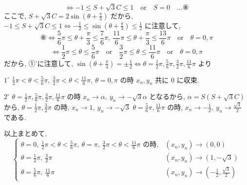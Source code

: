 \documentclass[../main.tex]{subfiles}
\begin{document}
\[
  \iff -1 \le S + \sqrt{3}C \le 1 \quad \text{or} \quad S = 0 \quad \dots \text{⑧}
\]
ここで, $S + \sqrt{3}C = 2 \sin\left(\theta + \frac{\pi}{3}\right)$ だから, $-1 \le S + \sqrt{3}C \le 1 \iff -\frac{1}{2} \le \sin\left(\theta + \frac{\pi}{3}\right) \le \frac{1}{2}$ に注意して,
\[
  ⑧ \iff \frac{5}{6}\pi \le \theta + \frac{\pi}{3} \le \frac{7}{6}\pi, \ \frac{11}{6}\pi \le \theta + \frac{\pi}{3} \le \frac{13}{6}\pi \quad \text{or} \quad \theta = 0, \pi
\]
\[
  \iff \frac{1}{2}\pi \le \theta \le \frac{5}{6}\pi \quad \text{or} \quad \frac{3}{2}\pi \le \theta \le \frac{11}{6}\pi \quad \text{or} \quad \theta = 0, \pi
\]
だから, ①'に注意して, $\sin\left(\theta + \frac{\pi}{3}\right) = \pm \frac{1}{2} \iff \theta = \frac{1}{2}\pi, \frac{5}{6}\pi, \frac{3}{2}\pi, \frac{11}{6}\pi$ より

$1^\circ$ $\frac{1}{2}\pi < \theta < \frac{5}{6}\pi, \ \frac{3}{2}\pi < \theta < \frac{11}{6}\pi, \ \theta = 0, \pi$ の時
$x_n, y_n$ 共に 0 に収束.

$2^\circ$ $\theta = \frac{1}{2}\pi, \frac{5}{6}\pi, \frac{3}{2}\pi, \frac{11}{6}\pi$ の時
$x_n \to \alpha, \ y_n \to -\sqrt{3}\alpha$ となるから, $\alpha = S(S + \sqrt{3}C)$ から,
$\theta = \frac{1}{2}\pi, \frac{3}{2}\pi$ の時, $x_n \to 1, \ y_n \to -\sqrt{3}$
$\theta = \frac{5}{6}\pi, \frac{11}{6}\pi$ の時, $x_n \to -\frac{1}{2}, \ y_n \to \frac{\sqrt{3}}{2}$
である.

以上まとめて,
\[
  \begin{cases}
    \theta = 0, \ \frac{1}{2}\pi < \theta < \frac{5}{6}\pi, \ \theta = \pi, \ \frac{3}{2}\pi < \theta < \frac{11}{6}\pi \text{ の時}, & (x_n, y_n) \longrightarrow (0, 0) \\
    \theta = \frac{1}{2}\pi, \ \frac{3}{2}\pi & (x_n, y_n) \longrightarrow (1, -\sqrt{3}) \\
    \theta = \frac{5}{6}\pi, \ \frac{11}{6}\pi & (x_n, y_n) \longrightarrow \left(-\frac{1}{2}, \frac{\sqrt{3}}{2}\right)
  \end{cases}
\]

\begin{center}
\end{center}
\end{document}
